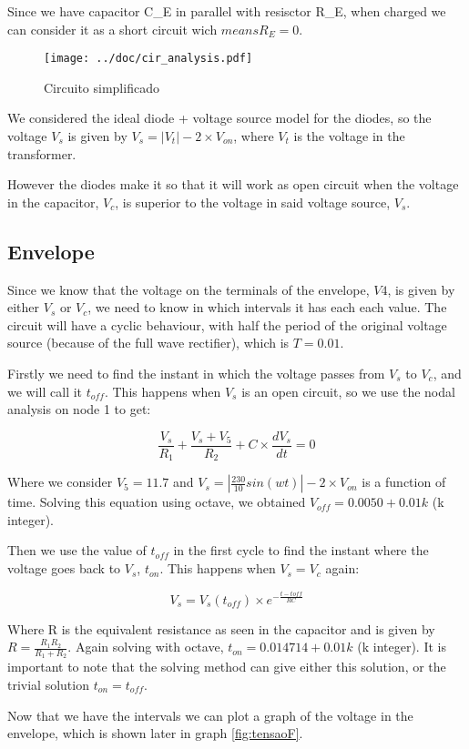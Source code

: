  Since we have capacitor C_E in parallel with resisctor R_E, when charged we can consider it as a short circuit wich $means R_E=0$.



\begin{figure}[H] \centering
\texttt{[image: ../doc/cir\_analysis.pdf]}
\caption{Circuito simplificado}
\label{fig:cir_simples}
\end{figure}

We considered the ideal diode + voltage source model for the diodes, so the voltage $V_s$ is given by $V_s= |V_t|-2\times V_{on}$, where $V_t$ is the voltage in the transformer.
\par
However the diodes make it so that it will work as open circuit when the voltage in the capacitor, $V_c$, is superior to the voltage in said voltage source, $V_s$.

\subsection{Envelope}
Since we know that the voltage on the terminals of the envelope, $V4$, is given by either $V_s$ or $V_c$, we need to know in which intervals it has each each value. The circuit will have a cyclic behaviour, with half the period of the original voltage source (because of the full wave rectifier), which is $T=0.01$.
\par
Firstly we need to find the instant in which the voltage passes from $V_s$ to $V_c$, and we will call it $t_{off}$. This happens when $V_s$ is an open circuit, so we use the nodal analysis on node 1 to get:

\begin{equation}\label{eq:t_off}
\frac{V_s}{R_1}+\frac{V_s+V_5}{R_2}+C\times\frac{dV_s}{dt}=0
\end{equation}

Where we consider $V_5=11.7$ and $V_s=|\frac{230}{10} sin(wt)|-2\times V_{on}$ is a function of time. Solving this equation using octave, we obtained $V_{off}=0.0050 + 0.01k$ (k integer).
\par
Then we use the value of $t_{off}$ in the first cycle to find the instant where the voltage goes back to $V_s$, $t_{on}$. This happens when $V_s=V_c$ again:

\begin{equation}\label{eq:t_on}
V_s=V_s(t_{off})\times e^{-\frac{t-t{off}}{RC}}
\end{equation}

Where R is the equivalent resistance as seen in the capacitor and is given by $R=\frac{R_1 R_2}{R_1 + R_2}$. Again solving with octave, $t_{on}=0.014714 + 0.01k$ (k integer). It is important to note that the solving method can give either this solution, or the trivial solution $t_{on}=t_{off}$.
\par
Now that we have the intervals we can plot a graph of the voltage in the envelope, which is shown later in graph \ref{fig:tensaoF}.

